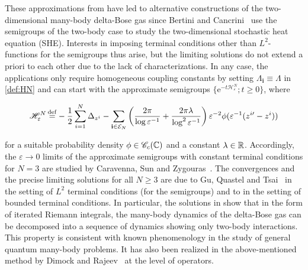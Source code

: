 \documentclass[12pt, twoside]{article}
\numberwithin{figure}{section}
\newcommand{\e}{{\mathrm e}}
\newcommand{\1}{\mathds 1}
\newcommand{\C}{{\mathscr C}}
\newcommand{\vep}{{\varepsilon}}
\newcommand{\ms}{\mathscr}
\newcommand{\mc}{\mathcal}
\newcommand{\R}{{\Bbb R}}
\newcommand{\2}{{\mathbf 1}}
\newcommand{\defeq}{{\stackrel{\rm def}{=}}}
\newcommand{\bi}{\mathbf i}
\begin{document}
These approximations from \cite{AGHH:2D} have led to alternative constructions of the two-dimensional many-body delta-Bose gas since Bertini and Cancrini~\cite{BC:2D} use the semigroups of the two-body case to study the two-dimensional stochastic heat equation (SHE). Interests in imposing terminal conditions other than $L^2$-functions for the semigroups thus arise, but the limiting solutions do not extend a priori to each other due to the lack of characterizations. In any case, the applications only require homogeneous coupling constants by setting $\Lambda_\bi\equiv \Lambda$ in \eqref{def:HN} and can start with the approximate semigroups $\{\e^{-t\ms H^N_{\vep}};t\geq 0\}$, where
\begin{linenomath*}\begin{align}\label{def:DBGvep}
\mathscr H_\vep^N\,
\defeq -\frac{1}{2}\sum_{i=1}^N\Delta_{z^i}- \sum_{\bi\in \mc E_N}\left(\frac{2\pi}{\log \vep^{-1}}+\frac{2\pi \lambda}{\log^2 \vep^{-1}}\right) \vep^{-2}\phi(\vep^{-1}(z^{i\prime}-z^i))
\end{align}\end{linenomath*}  
for a suitable probability density $\phi\in \C_c(\Bbb C)$ and a constant $\lambda\in \R$. Accordingly, the $\vep\to 0$ limits of the approximate semigroups with constant terminal conditions for $N=3$ are studied by Caravenna, Sun and Zygouras~\cite{CSZ:Mom}. The convergences and the precise limiting solutions for all $N\geq 3$ are due to Gu, Quastel and Tsai~\cite{GQT} in the setting of $L^2$ terminal conditions (for the semigroups) and to \cite{C:DBG} in the setting of bounded terminal conditions. In particular, the solutions in \cite{GQT,C:DBG} show that in the form of iterated Riemann integrals, the many-body dynamics of the delta-Bose gas can be decomposed into a sequence of dynamics showing only two-body interactions. This property is consistent with known phenomenology in the study of general quantum many-body problems. It has also been realized in the above-mentioned method by Dimock and Rajeev~\cite{DR:Schrodinger} at the level of operators.
\end{document}
